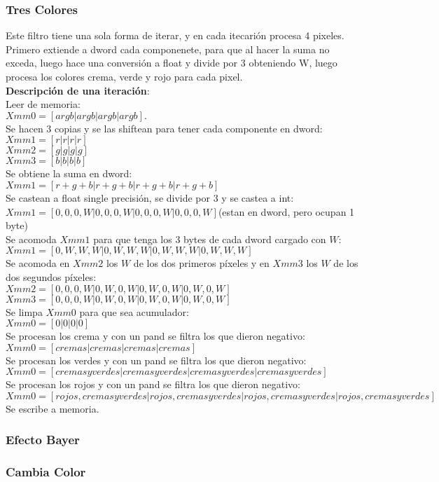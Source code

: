 \subsubsection{Tres Colores}
Este filtro tiene una sola forma de iterar, y en cada itecarión procesa 4 pixeles. Primero extiende a dword cada componenete, para que al hacer la suma no exceda, luego hace una conversión a float y divide por 3 obteniendo W, luego procesa los colores crema, verde y rojo para cada pixel.\\
\textbf{Descripción de una iteración}:\\
Leer de memoria:\\
$Xmm0 = [argb| argb| argb | argb].$\\
Se hacen 3 copias y se las shiftean para tener cada componente en dword:\\ 
$Xmm1 = [r| r| r| r]$\\
$Xmm2 = [g| g| g| g]$\\
$Xmm3 = [b| b| b| b]$\\
Se obtiene la suma en dword:\\
$Xmm1 = [r+g+b| r+g+b| r+g+b| r+g+b]$\\
Se castean a float single precisión, se divide por 3 y se castea a int:\\
$Xmm1 = [0,0,0,W| 0,0,0,W| 0,0,0,W| 0,0,0,W]$(estan en dword, pero ocupan 1 byte)\\
Se acomoda $Xmm1$ para que tenga los 3 bytes de cada dword cargado con $W$:\\
$Xmm1 = [0,W,W,W| 0,W,W,W| 0,W,W,W| 0,W,W,W]$\\
Se acomoda en $Xmm2$ los $W$ de los dos primeros píxeles y en $Xmm3$ los $W$ de los dos segundos píxeles:\\
$Xmm2 = [0,0,0,W|0,W,0,W|0,W,0,W|0,W,0,W]$\\
$Xmm3 = [0,0,0,W|0,W,0,W|0,W,0,W|0,W,0,W]$\\
Se limpa $Xmm0$ para que sea acumulador:\\
$Xmm0 = [0|0|0|0]$\\
Se procesan los crema y con un pand se filtra los que dieron negativo:\\
$Xmm0 = [cremas|cremas|cremas|cremas]$\\
Se procesan los verdes y con un pand se filtra los que dieron negativo:\\
$Xmm0 = [cremas y verdes|cremas y verdes|cremas y verdes|cremas y verdes]$\\
Se procesan los rojos y con un pand se filtra los que dieron negativo:\\
$Xmm0 = [rojos, cremas y verdes|rojos, cremas y verdes|rojos, cremas y verdes|rojos, cremas y verdes]$\\
Se escribe a memoria.\\
\subsubsection{Efecto Bayer}

\subsubsection{Cambia Color}